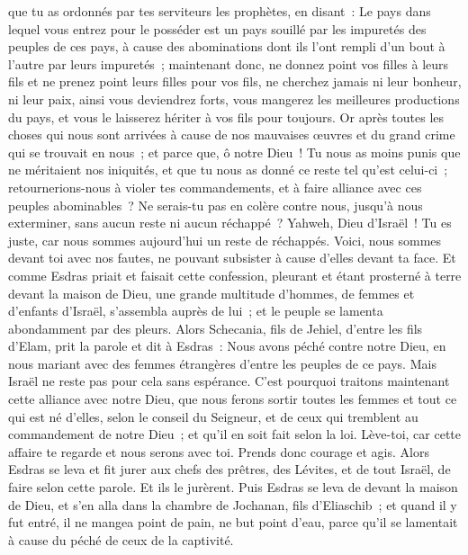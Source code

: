 \begin{multicols}{2}
que tu as ordonnés par tes serviteurs les prophètes, en disant~: Le pays dans lequel vous entrez pour le posséder est un pays souillé par les impuretés des peuples de ces pays, à cause des abominations dont ils l'ont rempli d'un bout à l'autre par leurs impuretés~;
maintenant donc, ne donnez point vos filles à leurs fils et ne prenez point leurs filles pour vos fils, ne cherchez jamais ni leur bonheur, ni leur paix, ainsi vous deviendrez forts, vous mangerez les meilleures productions du pays, et vous le laisserez hériter à vos fils pour toujours.
Or après toutes les choses qui nous sont arrivées à cause de nos mauvaises œuvres et du grand crime qui se trouvait en nous~; et parce que, ô notre Dieu~! Tu nous as moins punis que ne méritaient nos iniquités, et que tu nous as donné ce reste tel qu'est celui-ci~;
retournerions-nous à violer tes commandements, et à faire alliance avec ces peuples abominables~? Ne serais-tu pas en colère contre nous, jusqu'à nous exterminer, sans aucun reste ni aucun réchappé~?
Yahweh, Dieu d'Israël~! Tu es juste, car nous sommes aujourd'hui un reste de réchappés. Voici, nous sommes devant toi avec nos fautes, ne pouvant subsister à cause d'elles devant ta face.
\VerseOne{}Et comme Esdras priait et faisait cette confession, pleurant et étant prosterné à terre devant la maison de Dieu, une grande multitude d'hommes, de femmes et d'enfants d'Israël, s'assembla auprès de lui~; et le peuple se lamenta abondamment par des pleurs.
Alors Schecania, fils de Jehiel, d'entre les fils d'Elam, prit la parole et dit à Esdras~: Nous avons péché contre notre Dieu, en nous mariant avec des femmes étrangères d'entre les peuples de ce pays. Mais Israël ne reste pas pour cela sans espérance.
C'est pourquoi traitons maintenant cette alliance avec notre Dieu, que nous ferons sortir toutes les femmes et tout ce qui est né d'elles, selon le conseil du Seigneur, et de ceux qui tremblent au commandement de notre Dieu~; et qu'il en soit fait selon la loi.
Lève-toi, car cette affaire te regarde et nous serons avec toi. Prends donc courage et agis.
Alors Esdras se leva et fit jurer aux chefs des prêtres, des Lévites, et de tout Israël, de faire selon cette parole. Et ils le jurèrent.
Puis Esdras se leva de devant la maison de Dieu, et s'en alla dans la chambre de Jochanan, fils d'Eliaschib~; et quand il y fut entré, il ne mangea point de pain, ne but point d'eau, parce qu'il se lamentait à cause du péché de ceux de la captivité.

\end{multicols}
